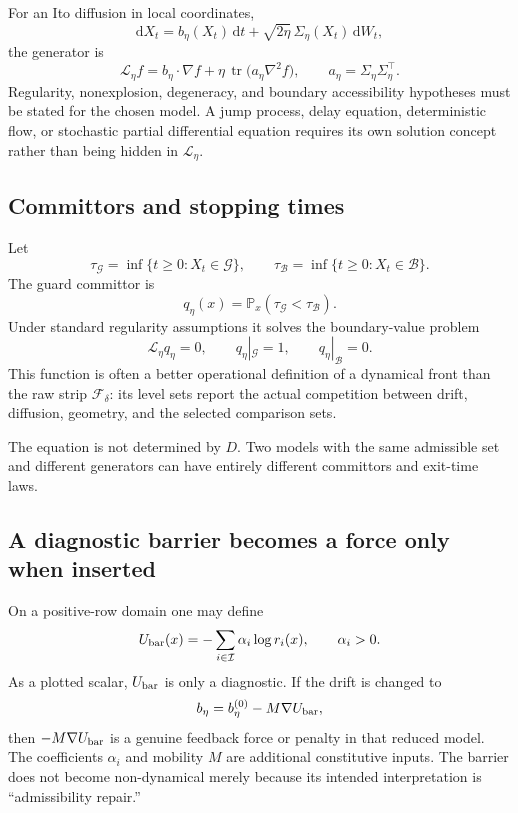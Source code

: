\documentclass[11pt]{article}
\theoremstyle{definition}
\theoremstyle{remark}
\newcommand{\cB}{\mathcal B}
\newcommand{\cF}{\mathcal F}
\newcommand{\cG}{\mathcal G}
\newcommand{\cI}{\mathcal I}
\newcommand{\cL}{\mathcal L}
\newcommand{\PP}{\mathbb P}
\newcommand{\dd}{\mathrm d}
\begin{document}
For an Ito diffusion in local coordinates,
\begin{equation}
 \dd X_t
 =
 b_\eta(X_t)\,\dd t
 +
 \sqrt{2\eta}\,\Sigma_\eta(X_t)\,\dd W_t,
\label{eq:diffusion}
\end{equation}
the generator is
\[
 \cL_\eta f
 =
 b_\eta\cdot\nabla f
 +
 \eta\,\operatorname{tr}
 \bigl(a_\eta\nabla^2f\bigr),
 \qquad
 a_\eta=\Sigma_\eta\Sigma_\eta^\top.
\]
Regularity, nonexplosion, degeneracy, and boundary accessibility
hypotheses must be stated for the chosen model.  A jump process, delay
equation, deterministic flow, or stochastic partial differential equation
requires its own solution concept rather than being hidden in
\(\cL_\eta\).

\subsection{Committors and stopping times}

Let
\[
 \tau_{\cG}=\inf\{t\ge0:X_t\in\cG\},
 \qquad
 \tau_{\cB}=\inf\{t\ge0:X_t\in\cB\}.
\]
The guard committor is
\[
 q_\eta(x)
 =
 \PP_x(\tau_{\cG}<\tau_{\cB}).
\]
Under standard regularity assumptions it solves the boundary-value
problem
\[
 \cL_\eta q_\eta=0,
 \qquad
 q_\eta|_{\cG}=1,
 \qquad
 q_\eta|_{\cB}=0.
\]
This function is often a better operational definition of a dynamical
front than the raw strip \(\cF_\delta\): its level sets report the actual
competition between drift, diffusion, geometry, and the selected
comparison sets.

The equation is not determined by \(D\).  Two models with the same
admissible set and different generators can have entirely different
committors and exit-time laws.

\subsection{A diagnostic barrier becomes a force only when inserted}

On a positive-row domain one may define
\[
 U_{\rm bar}(x)
 =
 -\sum_{i\in\cI}\alpha_i\log r_i(x),
 \qquad
 \alpha_i>0.
\]
As a plotted scalar, \(U_{\rm bar}\) is only a diagnostic.  If the drift is
changed to
\[
 b_\eta=b_\eta^{(0)}-M\nabla U_{\rm bar},
\]
then \(-M\nabla U_{\rm bar}\) is a genuine feedback force or penalty in
that reduced model.  The coefficients \(\alpha_i\) and mobility \(M\) are
additional constitutive inputs.  The barrier does not become
non-dynamical merely because its intended interpretation is
``admissibility repair.''
\end{document}
